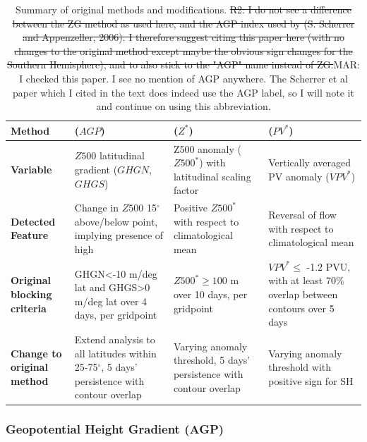 \documentclass[smallextended]{svjour3}       %
\numberwithin{equation}{section}
\begin{document}
\begin{table}
\caption{Summary of original methods and modifications. {\color{teal}\sout{R2: I do not see a difference between the ZG method as used here, and the AGP index used by (S. Scherrer and Appenzeller, 2006). I therefore suggest citing this paper here (with no changes to the original method except maybe the obvious sign changes for the Southern Hemisphere), and to also stick to the "AGP" name instead of ZG.}}{\color{blue}MAR: I checked this paper. I see no mention of AGP anywhere. The Scherrer et al paper which I cited in the text does indeed use the AGP label, so I will note it and continue on using this abbreviation.}}
\label{tabsum}
\begin{tabular}{|L{0.12\textwidth}|L{0.22\textwidth}|L{0.22\textwidth}|L{0.22\textwidth}|}
\hline
\textbf{Method} &  \textbf{\citealt{tibaldi_operational_1990} ($AGP$)}  & \textbf{\citealt{dole_persistent_1983} ($Z^*$)}  &
\textbf{\citealt{schwierz_perspicacious_2004} ($PV^*$)}  \\ \hline
\textbf{Variable} &  $Z500$ latitudinal gradient ($GHGN$, $GHGS$) &
Z500 anomaly ($Z500^*$) with latitudinal scaling factor 
& Vertically averaged PV anomaly ($VPV^*$) \\ \hline
\textbf{Detected Feature}  & Change in $Z500$ 15$^\circ$ above/below point, implying presence of high  
& Positive $Z500^*$ with respect to climatological mean 
& Reversal of flow with respect to climatological mean\\ \hline
\textbf{Original blocking criteria}   & GHGN\textless-10 m/deg lat and GHGS\textgreater0 m/deg lat over 4 days, per gridpoint  
& $Z500^*\geq 100$ m over 10 days, per gridpoint                        
& $VPV^*\leq$ -1.2 PVU, with at least 70\% overlap between contours over 5 days \\ \hline
\textbf{Change to original method}   & Extend analysis to all latitudes within 25-75$^{\circ}$, 5 days' persistence with contour overlap
& Varying anomaly threshold, 5 days' persistence with contour overlap
& Varying anomaly threshold with positive sign for SH \\ \hline
\end{tabular}
\end{table}

\subsubsection{Geopotential Height Gradient (AGP)}\label{ghgdef}
\end{document}
